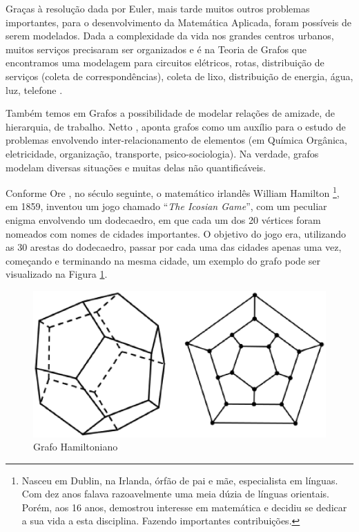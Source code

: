 Graças à resolução dada por Euler, mais tarde muitos outros problemas importantes, para o desenvolvimento da Matemática Aplicada, foram possíveis de serem modelados. Dada a complexidade da vida nos grandes centros urbanos, muitos serviços precisaram ser organizados e é na Teoria de Grafos que encontramos uma modelagem para circuitos elétricos, rotas, distribuição de serviços (coleta de correspondências), coleta de lixo, distribuição de energia, água, luz, telefone \cite{Mello:2007}.

Também temos em Grafos a possibilidade de modelar relações de amizade, de hierarquia, de trabalho. Netto \cite{Netto:2012}, aponta grafos como um auxílio para o estudo de problemas envolvendo inter-relacionamento de elementos (em Química Orgânica, eletricidade, organização, transporte, psico-sociologia). Na verdade, grafos modelam diversas situações e muitas delas não quantificáveis.

Conforme Ore \cite{Ore:1963}, no século seguinte, o matemático irlandês William Hamilton \footnote{Nasceu em Dublin, na Irlanda, órfão de pai e mãe, especialista em línguas. Com dez anos falava razoavelmente uma meia dúzia de línguas orientais. Porém, aos 16 anos, demostrou interesse em matemática e decidiu se dedicar a sua vida a esta disciplina. Fazendo importantes contribuições.}, em 1859, inventou um jogo chamado ``\textit{The Icosian Game}'', com um peculiar enigma envolvendo um dodecaedro, em que cada um dos 20 vértices foram nomeados com nomes de cidades importantes. O objetivo do jogo era, utilizando as 30 arestas do dodecaedro, passar por cada uma das cidades apenas uma vez, começando e terminando na mesma cidade, um exemplo do grafo pode ser visualizado na Figura \ref{grafo_hamiltoniano}.

\begin{figure}[!h]
	\centering
	\includegraphics[scale=0.5]{figuras/capitulo2/grafo_hamiltoniano.eps}
	\caption{Grafo Hamiltoniano}
	\label{grafo_hamiltoniano}
\end{figure}

